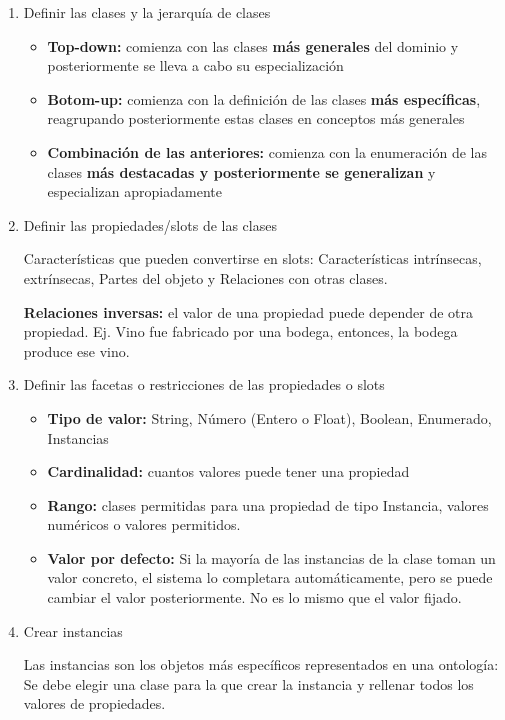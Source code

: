 \documentclass[12pt, twoside, openright]{report} %
\begin{document}
\begin{enumerate}
	\item Definir las clases y la jerarquía de clases
	      \begin{itemize}
		      \item \textbf{Top-down:} comienza con las clases \textbf{más generales} del dominio y posteriormente se lleva a cabo su especialización
		      \item \textbf{Botom-up:} comienza con la definición de las clases \textbf{más específicas}, reagrupando posteriormente estas clases en conceptos más generales
		      \item \textbf{Combinación de las anteriores:} comienza con la enumeración de las clases \textbf{más destacadas y posteriormente se generalizan} y especializan apropiadamente
	      \end{itemize}
	\item Definir las propiedades/slots de las clases
	      
	      Características que pueden convertirse en slots: Características intrínsecas, extrínsecas, Partes del objeto y Relaciones con otras clases.
	      
	      \textbf{Relaciones inversas:} el valor de una propiedad puede depender de otra propiedad. Ej. Vino fue fabricado por una bodega, entonces, la bodega produce ese vino.
	      
	\item Definir las facetas o restricciones de las propiedades o slots
	      \begin{itemize}
		      \item \textbf{Tipo de valor:} String, Número (Entero o Float), Boolean, Enumerado, Instancias
		      \item \textbf{Cardinalidad:} cuantos valores puede tener una propiedad
		      \item \textbf{Rango:} clases permitidas para una propiedad de tipo Instancia, valores numéricos o valores permitidos.
		      \item \textbf{Valor por defecto:} Si la mayoría de las instancias de la clase toman un valor concreto, el sistema lo completara automáticamente, pero se puede cambiar el valor posteriormente. No es lo mismo que el valor fijado.
	      \end{itemize}
	\item Crear instancias
	      
	      Las instancias son los objetos más específicos representados en una ontología: Se debe elegir una clase para la que crear la instancia y rellenar todos los valores de propiedades.
\end{enumerate}
\end{document}
